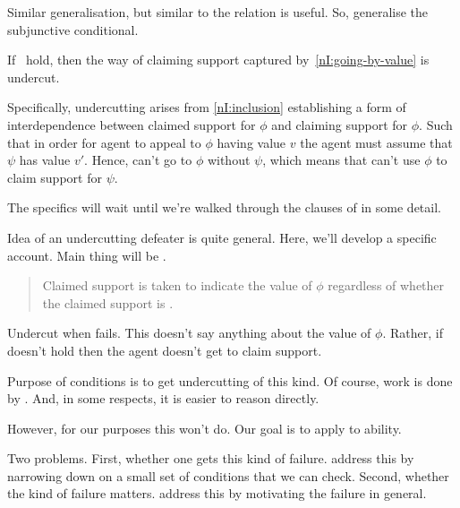 \begin{note}
  Similar generalisation, but similar to \citeauthor{Pollock:1974uk} the relation is useful.
  So, generalise the subjunctive conditional.

  If~\nIOTT{} hold, then the way of claiming support captured by~\ref{nI:going-by-value} is undercut.

  {
    \color{red}
    Specifically, undercutting arises from \ref{nI:inclusion} establishing a form of interdependence between claimed support for \(\phi\) and claiming support for \(\phi\).
  }
  Such that in order for agent to appeal to \(\phi\) having value \(v\) the agent must assume that \(\psi\) has value \(v'\).
  Hence, can't go to \(\phi\) without \(\psi\), which means that can't use \(\phi\) to claim support for \(\psi\).

  The specifics will wait until we're walked through the clauses of \nI{} in some detail.
\end{note}

\begin{note}[\eiS{}]
  Idea of an undercutting defeater is quite general.
  Here, we'll develop a specific account.
  Main thing will be \eiS{}.
  \begin{quote}
    \begin{proposition}[\eiS{-} --- \eiS{}]
      \color{blue}
      Claimed support is taken to indicate the value of \(\phi\) regardless of whether the claimed support is \mom{}.
    \end{proposition}
  \end{quote}
  Undercut when \eiS{} fails.
  This doesn't say anything about the value of \(\phi\).
  Rather, if \eiS{} doesn't hold then the agent doesn't get to claim support.
\end{note}

\begin{note}
  Purpose of conditions is to get undercutting of this kind.
  Of course, work is done by \eiS{}.
  And, in some respects, it is easier to reason directly.

  However, for our purposes this won't do.
  Our goal is to apply \nI{} to ability.

  Two problems.
  First, whether one gets this kind of failure.
  \nI{} address this by narrowing down on a small set of conditions that we can check.
  Second, whether the kind of failure matters.
  \nI{} address this by motivating the failure in general.
\end{note}

